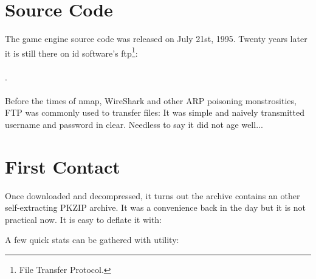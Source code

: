 \documentclass[book.tex]{subfiles}
\begin{document}
\section{Source Code}
The game engine source code was released on July 21st, 1995. Twenty years later it is still there on id software's ftp\footnote{File Transfer Protocol.}:\\ 
\\.\\
\\
 Before the times of nmap, WireShark and other ARP poisoning monstrosities, FTP was commonly used to transfer files: It was simple and naively transmitted username and password in clear. Needless to say it did not age well...\\

\section{First Contact}
Once downloaded and decompressed, it turns out the archive  contains an other self-extracting PKZIP archive. It was a convenience back in the day but it is not practical now. It is easy to deflate it with:\\
\par
\begin{minipage}{\textwidth}

\end{minipage}
\par
A few quick stats can be gathered with  utility:\\

\par
\begin{minipage}{\textwidth}

\end{minipage}
\end{document}
